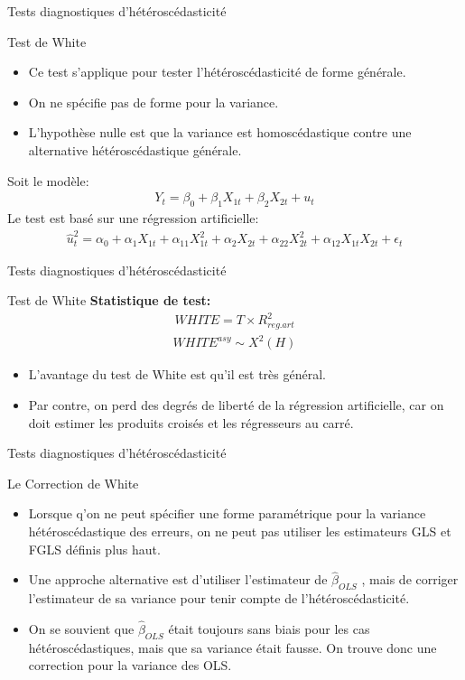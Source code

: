 \documentclass{beamer}
\begin{document}
\begin{frame}{Tests diagnostiques d'hétéroscédasticité}
\begin{block}{Test de White}
\begin{itemize}
\item Ce test s’applique pour tester l’hétéroscédasticité de forme générale.
\item On ne spécifie pas de forme pour la variance.
\item L’hypothèse nulle est que la variance est homoscédastique contre une alternative hétéroscédastique générale.
\end{itemize}
Soit le modèle:
\begin{align*}
Y_t=\beta_0+\beta_1 X_{1t}+\beta_2 X_{2t}+u_t
\end{align*}
Le test est basé sur une régression artificielle:
\begin{align*}
\hat{u}_t^2=\alpha_0+\alpha_1 X_{1t}+\alpha_{11} X_{1t}^2+\alpha_2 X_{2t}+\alpha_{22} X_{2t}^2+\alpha_{12} X_{1t}X_{2t}+\epsilon_t
\end{align*}
\end{block}
\end{frame}

\begin{frame}{Tests diagnostiques d'hétéroscédasticité}
\begin{block}{Test de White}
\textbf{Statistique de test:}
\begin{align*}
WHITE = T \times R_{reg.art}^2
\end{align*}
\begin{align*}
WHITE^{asy} \sim X^2(H)
\end{align*}
\begin{itemize}
\item L’avantage du test de White est qu’il est très général.
\item Par contre, on perd des degrés de liberté de la régression artificielle, car on doit estimer les produits croisés et les régresseurs au carré.
\end{itemize}
\end{block}
\end{frame}

\begin{frame}{Tests diagnostiques d'hétéroscédasticité}
\begin{block}{Le Correction de White}
\begin{itemize}
\item Lorsque q’on ne peut spécifier une forme paramétrique pour la variance hétéroscédastique des erreurs, on ne peut pas utiliser les estimateurs GLS et FGLS définis plus haut. 
\item Une approche alternative est d’utiliser l’estimateur de $\hat{\beta}_{OLS}$ , mais de corriger l’estimateur de sa variance pour tenir compte de l’hétéroscédasticité. 
\item On se souvient que $\hat{\beta}_{OLS}$ était toujours sans biais pour les cas hétéroscédastiques, mais que sa variance était fausse. On trouve donc une correction pour la variance des OLS.
\end{itemize}
\end{block}
\end{frame}
\end{document}
